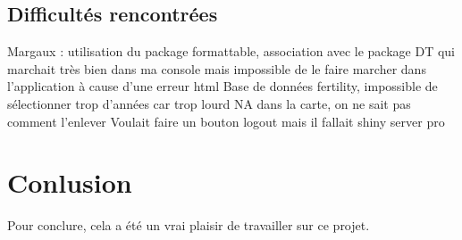 \documentclass[
]{article}
\begin{document}
\hypertarget{difficultuxe9s-rencontruxe9es}{%
\subsection{Difficultés
rencontrées}\label{difficultuxe9s-rencontruxe9es}}

Margaux : utilisation du package formattable, association avec le
package DT qui marchait très bien dans ma console mais impossible de le
faire marcher dans l'application à cause d'une erreur html Base de
données fertility, impossible de sélectionner trop d'années car trop
lourd NA dans la carte, on ne sait pas comment l'enlever Voulait faire
un bouton logout mais il fallait shiny server pro

\hypertarget{conlusion}{%
\section{Conlusion}\label{conlusion}}

Pour conclure, cela a été un vrai plaisir de travailler sur ce projet.
\end{document}
